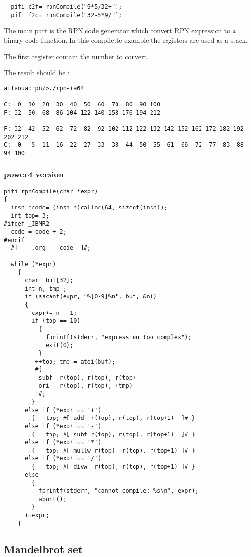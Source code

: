\documentclass{article}
\begin{document}
\begin{verbatim}
  pifi c2f= rpnCompile("9*5/32+");
  pifi f2c= rpnCompile("32-5*9/");
\end{verbatim}

The main part is the RPN code generator which convert RPN expression
to a binary code function. In this compilette example the registers
are used as a stack.

The first register contain the number to  convert.

The result should be :
\begin{verbatim}
allaoua:rpn/>./rpn-ia64 

C:  0  10  20  30  40  50  60  70  80  90 100 
F: 32  50  68  86 104 122 140 158 176 194 212 

F: 32  42  52  62  72  82  92 102 112 122 132 142 152 162 172 182 192 202 212 
C:  0   5  11  16  22  27  33  38  44  50  55  61  66  72  77  83  88  94 100 
\end{verbatim}

\subsubsection{power4 version}

\begin{lstlisting}
pifi rpnCompile(char *expr)
{
  insn *code= (insn *)calloc(64, sizeof(insn));
  int top= 3;
#ifdef _IBMR2
  code = code + 2;
#endif
  #[    .org    code  ]#;

  while (*expr)
    {
      char  buf[32];
      int n, tmp ;
      if (sscanf(expr, "%[0-9]%n", buf, &n))
      {
        expr+= n - 1;
        if (top == 10)
          {
            fprintf(stderr, "expression too complex");
            exit(0);
          }
         ++top; tmp = atoi(buf);
         #[
          subf  r(top), r(top), r(top)
          ori   r(top), r(top), (tmp)  
         ]#;
        }
      else if (*expr == '+')
        { --top; #[ add  r(top), r(top), r(top+1)  ]# }
      else if (*expr == '-')
        { --top; #[ subf r(top), r(top), r(top+1)  ]# }
      else if (*expr == '*')
        { --top; #[ mullw r(top), r(top), r(top+1) ]# }
      else if (*expr == '/')
        { --top; #[ divw  r(top), r(top), r(top+1) ]# }
      else
        {
          fprintf(stderr, "cannot compile: %s\n", expr);
          abort();
        }
      ++expr;
    }
\end{lstlisting}


\subsection{Mandelbrot set}
\end{document}
